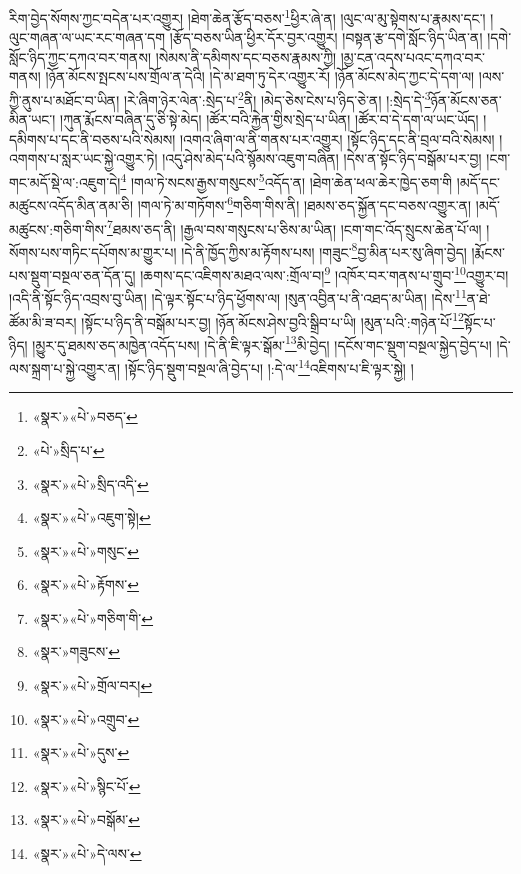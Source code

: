 རིག་བྱེད་སོགས་ཀྱང་བདེན་པར་འགྱུར། །ཐེག་ཆེན་རྩོད་བཅས་\footnote{«སྣར་»«པེ་»བཅད་}ཕྱིར་ཞེ་ན། །ལུང་ལ་མུ་སྟེགས་པ་རྣམས་དང་། །ལུང་གཞན་ལ་ཡང་རང་གཞན་དག །རྩོད་བཅས་ཡིན་ཕྱིར་དོར་བྱར་འགྱུར། །བསྟན་རྩ་དགེ་སློང་ཉིད་ཡིན་ན། །དགེ་སློང་ཉིད་ཀྱང་དཀའ་བར་གནས། །སེམས་ནི་དམིགས་དང་བཅས་རྣམས་ཀྱི། །མྱ་ངན་འདས་པའང་དཀའ་བར་གནས། །ཉོན་མོངས་སྤངས་པས་གྲོལ་ན་དེའི། །དེ་མ་ཐག་ཏུ་དེར་འགྱུར་རོ། །ཉོན་མོངས་མེད་ཀྱང་དེ་དག་ལ། །ལས་ཀྱི་ནུས་པ་མཐོང་བ་ཡིན། །རེ་ཞིག་ཉེར་ལེན་:སྲེད་པ་\footnote{«པེ་»སྲིད་པ་}ནི། །མེད་ཅེས་ངེས་པ་ཉིད་ཅེ་ན། །:སྲེད་དེ་\footnote{«སྣར་»«པེ་»སྲིད་འདི་}ཉོན་མོངས་ཅན་མིན་ཡང་། །ཀུན་རྨོངས་བཞིན་དུ་ཅི་སྟེ་མེད། །ཚོར་བའི་རྐྱེན་གྱིས་སྲེད་པ་ཡིན། །ཚོར་བ་དེ་དག་ལ་ཡང་ཡོད། །དམིགས་པ་དང་ནི་བཅས་པའི་སེམས། །འགའ་ཞིག་ལ་ནི་གནས་པར་འགྱུར། །སྟོང་ཉིད་དང་ནི་བྲལ་བའི་སེམས། །འགགས་པ་སླར་ཡང་སྐྱེ་འགྱུར་ཏེ། །འདུ་ཤེས་མེད་པའི་སྙོམས་འཇུག་བཞིན། །དེས་ན་སྟོང་ཉིད་བསྒོམ་པར་བྱ། །ངག་གང་མདོ་སྡེ་ལ་:འཇུག་དེ།\footnote{«སྣར་»«པེ་»འཇུག་སྟེ།} །གལ་ཏེ་སངས་རྒྱས་གསུངས་\footnote{«སྣར་»«པེ་»གསུང་}འདོད་ན། །ཐེག་ཆེན་ཕལ་ཆེར་ཁྱེད་ཅག་གི །མདོ་དང་མཚུངས་འདོད་མིན་ནམ་ཅི། །གལ་ཏེ་མ་གཏོགས་\footnote{«སྣར་»«པེ་»རྟོགས་}གཅིག་གིས་ནི། །ཐམས་ཅད་སྐྱོན་དང་བཅས་འགྱུར་ན། །མདོ་མཚུངས་:གཅིག་གིས་\footnote{«སྣར་»«པེ་»གཅིག་གི་}ཐམས་ཅད་ནི། །རྒྱལ་བས་གསུངས་པ་ཅིས་མ་ཡིན། །ངག་གང་འོད་སྲུངས་ཆེན་པོ་ལ། །སོགས་པས་གཏིང་དཔོགས་མ་གྱུར་པ། །དེ་ནི་ཁྱོད་ཀྱིས་མ་རྟོགས་པས། །གཟུང་\footnote{«སྣར་»གཟུངས་}བྱ་མིན་པར་སུ་ཞིག་བྱེད། །རྨོངས་པས་སྡུག་བསྔལ་ཅན་དོན་དུ། །ཆགས་དང་འཇིགས་མཐའ་ལས་:གྲོལ་བ།\footnote{«སྣར་»«པེ་»གྲོལ་བར།} །འཁོར་བར་གནས་པ་གྲུབ་\footnote{«སྣར་»«པེ་»འགྲུབ་}འགྱུར་བ། །འདི་ནི་སྟོང་ཉིད་འབྲས་བུ་ཡིན། །དེ་ལྟར་སྟོང་པ་ཉིད་ཕྱོགས་ལ། །སུན་འབྱིན་པ་ནི་འཐད་མ་ཡིན། །དེས་\footnote{«སྣར་»«པེ་»དུས་}ན་ཐེ་ཚོམ་མི་ཟ་བར། །སྟོང་པ་ཉིད་ནི་བསྒོམ་པར་བྱ། །ཉོན་མོངས་ཤེས་བྱའི་སྒྲིབ་པ་ཡི། །མུན་པའི་:གཉེན་པོ་\footnote{«སྣར་»«པེ་»སྙིང་པོ་}སྟོང་པ་ཉིད། །མྱུར་དུ་ཐམས་ཅད་མཁྱེན་འདོད་པས། །དེ་ནི་ཇི་ལྟར་སྒོམ་\footnote{«སྣར་»«པེ་»བསྒོམ་}མི་བྱེད། །དངོས་གང་སྡུག་བསྔལ་སྐྱེད་བྱེད་པ། །དེ་ལས་སྐྲག་པ་སྐྱེ་འགྱུར་ན། །སྟོང་ཉིད་སྡུག་བསྔལ་ཞི་བྱེད་པ། །:དེ་ལ་\footnote{«སྣར་»«པེ་»དེ་ལས་}འཇིགས་པ་ཇི་ལྟར་སྐྱེ། །
